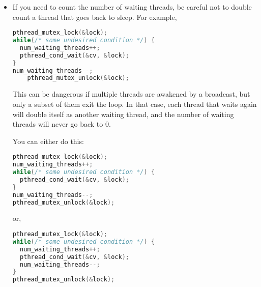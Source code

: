 \documentclass[11pt,usletter]{article}
\begin{document}
\begin{itemize}
  \item If you need to count the number of waiting threads, be careful not to
    double count a thread that goes back to sleep. For example,

    \begin{lstlisting}[style=netseclab,language=c]
pthread_mutex_lock(&lock);
while(/* some undesired condition */) {
  num_waiting_threads++;
  pthread_cond_wait(&cv, &lock);
}
num_waiting_threads--;
    pthread_mutex_unlock(&lock);
    \end{lstlisting}

    This can be dangerous if multiple threads are awakened by a broadcast, but
    only a subset of them exit the loop. In that case, each thread that waits
    again will double itself as another waiting thread, and the number of
    waiting threads will never go back to 0.

    \noindent You can either do this:

    \begin{lstlisting}[style=netseclab,language=c]
pthread_mutex_lock(&lock);
num_waiting_threads++;
while(/* some undesired condition */) {
  pthread_cond_wait(&cv, &lock);
}
num_waiting_threads--;
pthread_mutex_unlock(&lock);
    \end{lstlisting}

    or,

    \begin{lstlisting}[style=netseclab,language=c]
pthread_mutex_lock(&lock);
while(/* some undesired condition */) {
  num_waiting_threads++;
  pthread_cond_wait(&cv, &lock);
  num_waiting_threads--;
}
pthread_mutex_unlock(&lock);
    \end{lstlisting}

\end{itemize}
  
\end{document}
